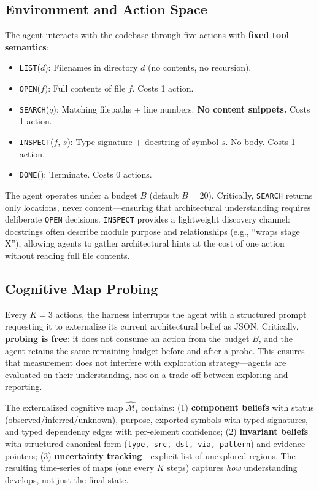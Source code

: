 \documentclass{article}
\begin{document}
\subsection{Environment and Action Space}

The agent interacts with the codebase through five actions with \textbf{fixed tool semantics}:
\begin{itemize}[nosep]
    \item \texttt{LIST}($d$): Filenames in directory $d$ (no contents, no recursion).
    \item \texttt{OPEN}($f$): Full contents of file $f$. Costs 1 action.
    \item \texttt{SEARCH}($q$): Matching filepaths + line numbers. \textbf{No content snippets.} Costs 1 action.
    \item \texttt{INSPECT}($f$, $s$): Type signature + docstring of symbol $s$. No body. Costs 1 action.
    \item \texttt{DONE}(): Terminate. Costs 0 actions.
\end{itemize}
The agent operates under a budget $B$ (default $B{=}20$). Critically, \texttt{SEARCH} returns only locations, never content---ensuring that architectural understanding requires deliberate \texttt{OPEN} decisions. \texttt{INSPECT} provides a lightweight discovery channel: docstrings often describe module purpose and relationships (e.g., ``wraps stage X''), allowing agents to gather architectural hints at the cost of one action without reading full file contents.

\subsection{Cognitive Map Probing}
\label{sec:probing}

Every $K{=}3$ actions, the harness interrupts the agent with a structured prompt requesting it to externalize its current architectural belief as JSON. Critically, \textbf{probing is free}: it does not consume an action from the budget $B$, and the agent retains the same remaining budget before and after a probe. This ensures that measurement does not interfere with exploration strategy---agents are evaluated on their understanding, not on a trade-off between exploring and reporting.

The externalized cognitive map $\hat{\mathcal{M}}_t$ contains: (1) \textbf{component beliefs} with status (observed/inferred/unknown), purpose, exported symbols with typed signatures, and typed dependency edges with per-element confidence; (2) \textbf{invariant beliefs} with structured canonical form (\texttt{type, src, dst, via, pattern}) and evidence pointers; (3) \textbf{uncertainty tracking}---explicit list of unexplored regions. The resulting time-series of maps (one every $K$ steps) captures \emph{how} understanding develops, not just the final state.
\end{document}
